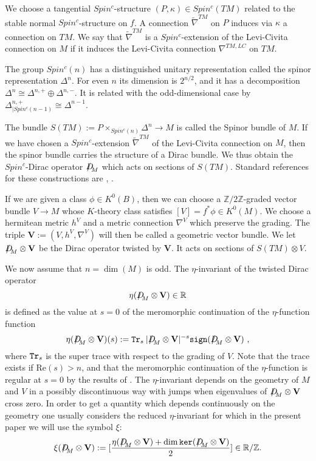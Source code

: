 \documentclass[12pt]{article}
\newcommand{\Ree}{\mathrm{Re}}
\renewcommand{\ker}{{\tt ker}}
\newcommand{\Z}{{\mathbb{Z}}}
\newcommand{\R}{{\mathbb{R}}}
\newcommand{\bV}{{\mathbf{V}}}
\newcommand{\Dirac}{{D\hspace{-0.27cm}/}}
\newcommand{\Tr}{{\tt Tr}}
\newcommand{\sign}{{\tt sign}}
\begin{document}
We choose  
 a tangential $Spin^{c}$-structure   $(P,\kappa)\in Spin^{c}(TM)$ related to  the stable normal $Spin^{c}$-structure on $f$.
  A connection $\tilde \nabla^{TM}$ on $P$ induces via $\kappa$ a connection on $TM$. We say that $\tilde \nabla^{TM}$ is a $Spin^{c}$-extension of the Levi-Civita connection on $M$ if it induces the Levi-Civita connection $\nabla^{TM,LC}$ on $TM$.

The group $Spin^{c}(n)$ has a distinguished unitary  representation called the spinor representation $\Delta^{n}$. For even $n$ its dimension is $2^{n/2}$, and it has a decomposition $\Delta^{n}\cong \Delta^{n,+}\oplus \Delta^{n,-}$. It is related with the odd-dimensional case by  $\Delta^{n,+}_{|Spin^{c}(n-1)}\cong \Delta^{n-1}$.

The bundle $S(TM):=P\times_{Spin^{c}(n)}\Delta^{n}\to M$ is called the Spinor bundle of $M$.
If we have chosen a $Spin^{c}$-extension $\tilde \nabla^{TM}$ of the Levi-Civita connection on $M$, then the spinor bundle carries the structure of a Dirac bundle. We thus obtain the  $Spin^{c}$-Dirac operator $\Dirac_{M}$ which acts on sections of $S(TM)$. Standard references for these constructions are \cite[Ch. 3]{MR2273508},  \cite[App. D]{MR1031992}.


 If we are given a  class $\phi\in K^{0}(B )$, then  we can choose a $\Z/2\Z$-graded
vector bundle $V\to M$ whose $K$-theory class satisfies $[V]=f^{*}\phi\in K^{0}(M )$.
We choose a hermitean metric $h^{V}$ and a metric connection $\nabla^{V}$ which preserve the grading.  The triple $\bV:=(V,h^{V},\nabla^{V})$ will then be called a geometric vector bundle.
We let $\Dirac_{M}\otimes \bV$ be the Dirac operator twisted by $\bV$. It acts on sections of $S(TM)\otimes V$.

We now assume that $n=\dim(M)$ is odd.  The  $\eta$-invariant \cite{MR0397797}
of the twisted Dirac operator 
 $$\eta(\Dirac_{M}\otimes \bV)\in \R$$  is defined  as the value at $s=0$ of the meromorphic continuation of the $\eta$-function function $$\eta(\Dirac_{M}\otimes \bV)(s):=\Tr_{s} \: |\Dirac_{M}\otimes \bV|^{-s}\sign(\Dirac_{M}\otimes \bV)\ ,$$
 where $\Tr_{s}$ is the super trace with respect to the grading of $V$. 
Note that the trace exists if $\Ree(s)>n$, and that the meromorphic continuation of the $\eta$-function is regular at $s=0$ by the results of  \cite{MR0397797}.
 The $\eta$-invariant depends on the geometry of $M$ and $V$ in a possibly discontinuous way with jumps when eigenvalues of $\Dirac_{M}\otimes \bV$ cross zero. In order to get a quantity which depends continuously on the geometry one usually considers the reduced $\eta$-invariant for which in the present paper we will use the symbol $\xi$: 
\begin{equation}\label{eq132}\xi(\Dirac_{M}\otimes \bV):=[\frac{\eta(\Dirac_{M}\otimes \bV)+\dim\ker(\Dirac_{M}\otimes \bV)}{2}]\in \R/\Z .\end{equation}
\end{document}
